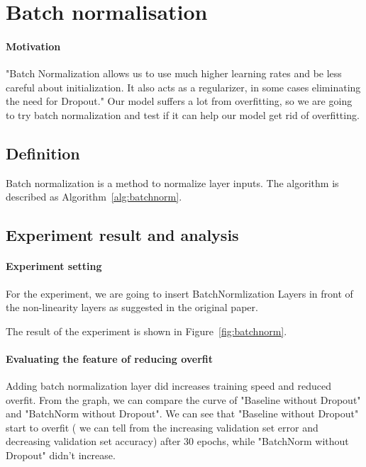 \documentclass{article}
\begin{document}

\section{Batch normalisation}

\paragraph{Motivation}
"Batch Normalization allows us to use much higher learning rates and be less careful about initialization. It also acts as a regularizer, in some cases eliminating the need for Dropout." \citep{DBLP:journals/corr/IoffeS15} Our model suffers a lot from overfitting, so we are going to try batch normalization and test if it can help our model get rid of overfitting.


\subsection{Definition} Batch normalization \citep{DBLP:journals/corr/IoffeS15} is a method to normalize layer inputs.  The algorithm is described as Algorithm~\ref{alg:batchnorm}. \citep{DBLP:journals/corr/IoffeS15}



\subsection{Experiment result and analysis} 

\paragraph{Experiment setting}
For the experiment, we are going to insert BatchNormlization Layers in front of the non-linearity layers as suggested in the original paper\citep{DBLP:journals/corr/IoffeS15}.

The result of the experiment is shown in Figure~\ref{fig:batchnorm}.

\paragraph{Evaluating the feature of reducing overfit} Adding batch normalization layer did increases training speed and reduced overfit. From the graph, we can compare the curve of "Baseline without Dropout" and "BatchNorm without Dropout". We can see that "Baseline without Dropout" start to overfit ( we can tell from the increasing validation set error and decreasing validation set accuracy) after 30 epochs, while "BatchNorm without Dropout" didn't increase. 
\end{document}
